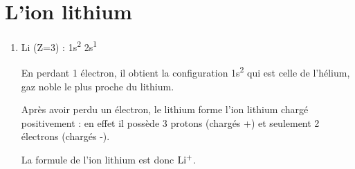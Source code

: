 \documentclass[12pt,a4paper,fleqn]{article}
\begin{document}
\section*{L'ion lithium}

\begin{enumerate}[resume]
\item Li (Z=3) : 1s\textsuperscript{2} 2s\textsuperscript{1}

En perdant 1 électron, il obtient la configuration 1s\textsuperscript{2} qui est celle de l'hélium, gaz noble le plus proche du lithium.

Après avoir perdu un électron, le lithium forme l'ion lithium chargé positivement : en effet il possède 3 protons (chargés +) et seulement 2 électrons (chargés -).

La formule de l'ion lithium est donc $\rm{Li^+}$.

\end{enumerate}
\end{document}
